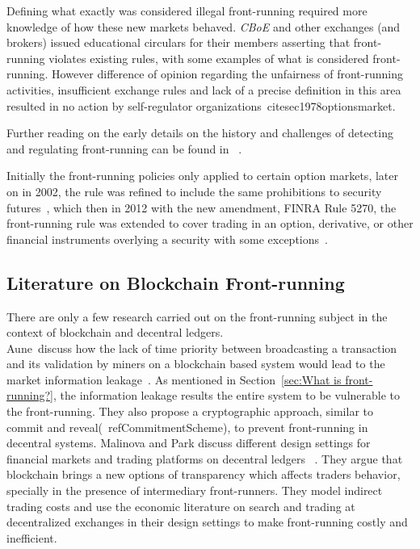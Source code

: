 Defining what exactly was considered illegal front-running required more knowledge of how these new markets behaved. \textit{CBoE} and other exchanges (and brokers) issued educational circulars for their members asserting that front-running violates existing rules, with some examples of what is considered front-running. However difference of opinion regarding the unfairness of front-running activities, insufficient exchange rules and lack of a precise definition in this area resulted in no action by self-regulator organizations~cite{sec1978optionsmarket}. 

Further reading on the early details on the history and challenges of detecting and regulating front-running can be found in~\cite{markham1988front} . %

Initially the front-running policies only applied to certain option markets, later on in 2002, the rule was refined to include the same prohibitions to security futures~\cite{finra_2002}, which then in 2012 with the new amendment, FINRA Rule 5270, the front-running rule was extended to cover trading in an option, derivative, or other financial instruments overlying a security with some exceptions~\cite{sec2012frontrunning, finra_2012}.


\subsection{Literature on Blockchain Front-running}
There are only a few research carried out on the front-running subject in the context of blockchain and decentral ledgers. \\

Aune~\etal discuss how the lack of time priority between broadcasting a transaction and its validation by miners on a blockchain based system would lead to the market information leakage~\cite{aune2017footprints}. As mentioned in Section~\ref{sec:What is front-running?}, the information leakage results the entire system to be vulnerable to the front-running. They also propose a cryptographic approach, similar to commit and reveal(~ref{CommitmentScheme}), to prevent front-running in decentral systems. %
Malinova and Park discuss different design settings for financial markets and trading platforms on decentral ledgers ~\cite{malinova2017market}.  They argue that blockchain brings a new options of transparency which affects traders behavior, specially in the presence of intermediary front-runners. They model indirect trading costs and use the economic literature on search and trading at decentralized exchanges in their design settings to make front-running costly and inefficient.

